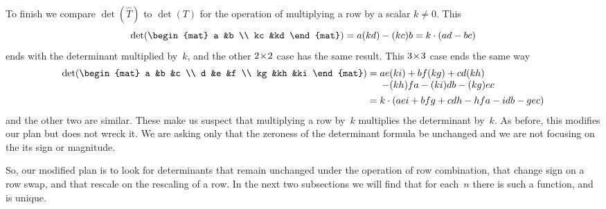 To finish
we compare \( \det(\hat{T}) \) to \( \det(T) \) for the operation
of multiplying a row by a scalar $k\neq 0$. 
This
\begin{equation*}
  \det(
    \begin{mat}
      a   &b   \\
      kc  &kd
    \end{mat}
  )
  = a(kd) - (kc)b
  =k\cdot (ad-bc)
\end{equation*}
ends with the determinant multiplied by~$k$,
and the other $2 \! \times \! 2$ case has the same result.
This \(3 \! \times \! 3\) case ends the same way
\begin{align*}
  \det(
  \begin{mat}
    a    &b    &c   \\
    d    &e    &f   \\
    kg   &kh   &ki
  \end{mat}
  )
   &= \begin{array}[t]{@{}l@{}}
         ae(ki) + bf(kg) + cd(kh)                \\
         \>- (kh)fa - (ki)db - (kg)ec  
      \end{array}                                      \\
   &= k\cdot(aei + bfg + cdh - hfa - idb - gec)
\end{align*}
and the other two are similar.
These make us suspect that multiplying a row by~$k$
multiplies the determinant by~$k$.
As before, this modifies our plan but does not wreck it.
We are asking only that the
zeroness of the determinant formula be unchanged and we are not focusing on the
its sign or magnitude.

So, our modified plan is to look for determinants that remain unchanged
under the operation of row combination, that change sign on
a row swap, and that rescale on the rescaling of a row.
In the next two subsections we will find that for each~$n$
there is such a function, and is unique.

